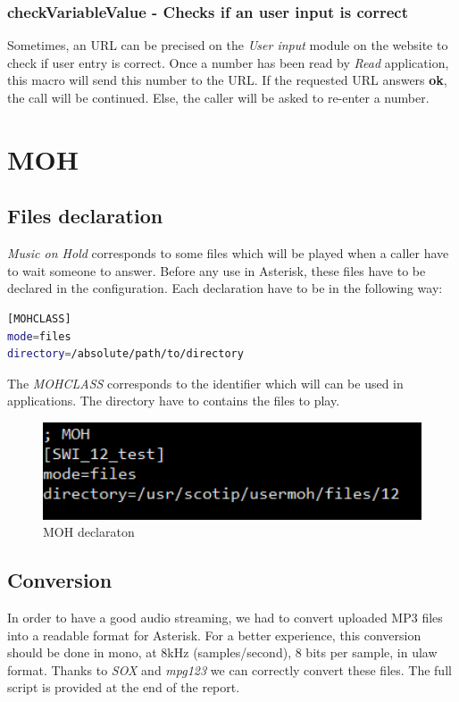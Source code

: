 \subsubsection{checkVariableValue - Checks if an user input is correct}
Sometimes, an URL can be precised on the \textit{User input} module on the website to check if user entry is correct. Once a number has been read by \textit{Read} application, this macro will send this number to the URL. If the requested URL answers \textbf{ok}, the call will be continued. Else, the caller will be asked to re-enter a number.




\section{MOH}
\subsection{Files declaration}
\textit{Music on Hold} corresponds to some files which will be played when a caller have to wait someone to answer. Before any use in Asterisk, these files have to be declared in the configuration. 
Each declaration have to be in the following way: 

\begin{lstlisting}[language=bash,caption={bash}]
[MOHCLASS]
mode=files
directory=/absolute/path/to/directory
\end{lstlisting}

The \textit{MOHCLASS} corresponds to the identifier which will can be used in applications. The directory have to contains the files to play. 


\begin{figure}[!ht]
  \caption{MOH declaraton}
  \centering
    \includegraphics[width=1\textwidth]{img/MOH.png}
\end{figure}


\subsection{Conversion}
In order to have a good audio streaming, we had to convert uploaded MP3 files into a readable format for Asterisk. For a better experience, this conversion should be done in mono, at 8kHz (samples/second), 8 bits per sample, in ulaw format. Thanks to \textit{SOX} and \textit{mpg123} we can correctly convert these files.	
The full script is provided at the end of the report.





